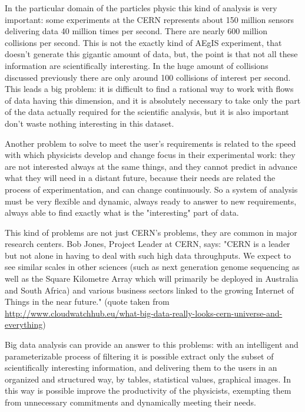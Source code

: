 In the particular domain of the particles physic this kind of analysis is very important: some experiments at the CERN represents about 150 million sensors delivering data 40 million times per second. There are nearly 600 million collisions per second. This is not the exactly kind of AEgIS experiment, that doesn't generate this gigantic amount of data, but, the point is that not all these information are scientifically interesting. In the huge amount of collisions discussed previously there are only around 100 collisions of interest per second.
This leads a big problem: it is difficult to find a rational way to work with flows of data having this dimension, and it is absolutely necessary to take only the part of the data actually required for the scientific analysis, but it is also important don't waste nothing interesting in this dataset.

Another problem to solve to meet the user's requirements is related to the speed with which physicists develop and change focus in their experimental work: they are not interested always at the same things, and they cannot predict in advance what they will need in a distant future, because their needs are related the process of experimentation, and can change continuously. 
So a system of analysis must be very flexible and dynamic, always ready to answer to new requirements, always able to find exactly what is the "interesting" part of data.  

This kind of problems are not just CERN's problems, they are common in major research centers. Bob Jones, Project Leader at CERN, says:
"CERN is a leader but not alone in having to deal with such high data throughputs. We expect to see similar scales in other sciences (such as next generation genome sequencing as well as the Square Kilometre Array which will primarily be deployed in Australia and South Africa) and various business sectors linked to the growing Internet of Things in the near future."
(quote taken from \url{http://www.cloudwatchhub.eu/what-big-data-really-looks-cern-universe-and-everything})
 
Big data analysis can provide an answer to this problems: with an intelligent and parameterizable process of filtering it is possible extract only the subset of scientifically interesting information, and delivering them to the users in an organized and structured way, by tables, statistical values, graphical images. 
In this way is possible improve the productivity of the physicists, exempting them from unnecessary commitments and dynamically meeting their needs. 

